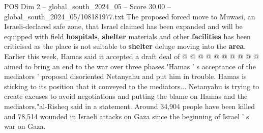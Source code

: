\begin{textsample}{POS Dim 2 – global\_south\_2024\_05 – Score 30.00 – global\_south\_2024\_05/108181977.txt}
The proposed forced move to Muwasi, an Israeli-declared safe zone, that Israel claimed has been expanded and will be equipped with field \textbf{hospitals}, \textbf{shelter} materials and other \textbf{facilities} has been criticised as the place is not suitable to \textbf{shelter} deluge moving into the \textbf{area}.
Earlier this week, Hamas said it accepted a draft deal of @ @ @ @ @ @ @ @ @ @ aimed to bring an end to the war over three phases."Hamas ' s acceptance of the mediators ' proposal disoriented Netanyahu and put him in trouble.
Hamas is sticking to its position that it conveyed to the mediators...
Netanyahu is trying to create excuses to avoid negotiations and putting the blame on Hamas and the mediators,"al-Risheq said in a statement.
Around 34,904 people have been killed and 78,514 wounded in Israeli attacks on Gaza since the beginning of Israel ' s war on Gaza.

\end{textsample}
